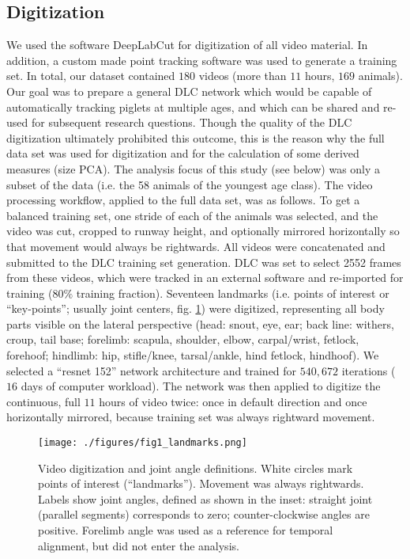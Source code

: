 \subsection{Digitization}
\label{sec:org3ecf574}
We used the software DeepLabCut \citep[DLC,][]{Mathis2018} for digitization of all video material.
In addition, a custom made point tracking software \citep{MMielke2020} was used to generate a training set.
In total, our dataset contained \(180\) videos (more than \(11\) hours, \(169\) animals).
Our goal was to prepare a general DLC network which would be capable of automatically tracking piglets at multiple ages, and which can be shared and re-used for subsequent research questions.
Though the quality of the DLC digitization ultimately prohibited this outcome, this is the reason why the full data set was used for digitization and for the calculation of some derived measures (size PCA).
The analysis focus of this study (see below) was only a subset of the data (i.e. the 58 animals of the youngest age class).
The video processing workflow, applied to the full data set, was as follows.
To get a balanced training set, one stride of each of the animals was selected, and the video was cut, cropped to runway height, and optionally mirrored horizontally so that movement would always be rightwards.
All videos were concatenated and submitted to the DLC training set generation.
DLC was set to select 2552 frames from these videos, which were tracked in an external software and re-imported for training (\(80 \%\) training fraction).
Seventeen landmarks (i.e. points of interest or ``key-points''; usually joint centers, fig. \ref{fig:landmarks}) were digitized, representing all body parts visible on the lateral perspective (head: snout, eye, ear; back line: withers, croup, tail base; forelimb: scapula, shoulder, elbow, carpal/wrist, fetlock, forehoof; hindlimb: hip, stifle/knee, tarsal/ankle, hind fetlock, hindhoof).
We selected a ``resnet 152'' network architecture and trained for \(540,672\) iterations (\(16\) days of computer workload).
The network was then applied to digitize the continuous, full \(11\) hours of video twice: once in default direction and once horizontally mirrored, because training set was always rightward movement.

\begin{figure}[p]
\centering
\texttt{[image: ./figures/fig1\_landmarks.png]}
\caption{\label{fig:landmarks}Video digitization and joint angle definitions. White circles mark points of interest (``landmarks''). Movement was always rightwards. Labels show joint angles, defined as shown in the inset: straight joint (parallel segments) corresponds to zero; counter-clockwise angles are positive. Forelimb angle was used as a reference for temporal alignment, but did not enter the analysis.}
\end{figure}



